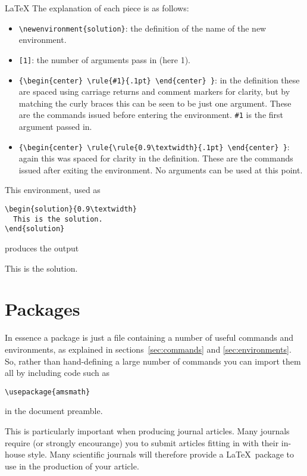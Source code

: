 \begin{chapter}{\LaTeX}
The explanation of each piece is as follows:
\begin{itemize}
\item \verb|\newenvironment{solution}|: the definition of the name of the new environment.
\item \verb|[1]|: the number of arguments pass in (here 1).
\item \verb|{\begin{center} \rule{#1}{.1pt} \end{center} }|: in the definition these are spaced using carriage returns and comment markers for clarity, but by matching the curly braces this can be seen to be just one argument. These are the commands issued before entering the environment. \verb|#1| is the first argument passed in.
\item \verb|{\begin{center} \rule{\rule{0.9\textwidth}{.1pt} \end{center} }|: again this was spaced for clarity in the definition. These are the commands issued after exiting the environment. No arguments can be used at this point.
\end{itemize}

This environment, used as
%
\begin{verbatim}
\begin{solution}{0.9\textwidth}
  This is the solution.
\end{solution}
\end{verbatim}
%
produces the output
%
\begin{solution}{0.9\textwidth}
  This is the solution.
\end{solution}
%

\section{Packages}
\label{sec:packages}

In essence a package is just a file containing a number of useful commands and environments, as explained in sections~\ref{sec:commands} and \ref{sec:environments}. So, rather than hand-defining a large number of commands you can import them all by including code such as
%
\begin{verbatim}
\usepackage{amsmath}
\end{verbatim}
%
in the document preamble.

This is particularly important when producing journal articles. Many journals require (or strongly encourange) you to submit articles fitting in with their in-house style. Many scientific journals will therefore provide a \LaTeX\ package to use in the production of your article.


\end{chapter}
